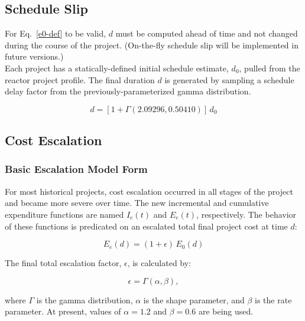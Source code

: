 \documentclass{article}
\begin{document}
\subsection{Schedule Slip}

For Eq.~\eqref{e0-def} to be valid, $d$ must be computed ahead of time and not changed during the course of the project.
(On-the-fly schedule slip will be implemented in future versions.) \\

Each project has a statically-defined initial schedule estimate, $d_0$, pulled from the reactor project profile.
The final duration $d$ is generated by sampling a schedule delay factor from the previously-parameterized gamma distribution.

\begin{equation}
  d = \left[ 1 + \Gamma \left( 2.09296, 0.50410 \right) \right] \, d_0
\end{equation}

\subsection{Cost Escalation}

\subsubsection{Basic Escalation Model Form}

For most historical projects, cost escalation occurred in all stages of the project and became more severe over time.
The new incremental and cumulative expenditure functions are named $I_e(t)$ and $E_e(t)$, respectively.
The behavior of these functions is predicated on an escalated total final project cost at time $d$:

\begin{equation}
  E_e(d) = (1 + \epsilon) \, E_0(d)
\end{equation}

The final total escalation factor, $\epsilon$, is calculated by:

\begin{equation*}
  \epsilon = \Gamma \left( \alpha, \beta \right),
\end{equation*}

where $\Gamma$ is the gamma distribution, $\alpha$ is the shape parameter, and $\beta$ is the rate parameter. At present, values of $\alpha = 1.2$ and $\beta = 0.6$ are being used.\\
\end{document}

